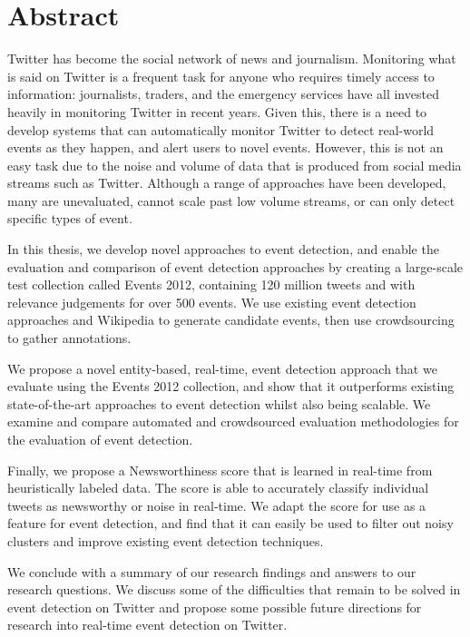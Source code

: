 
\chapter*{Abstract}
\thispagestyle{empty}
\vspace{-1cm}

Twitter has become the social network of news and journalism. Monitoring what is said on Twitter is a frequent task for anyone who requires timely access to information: journalists, traders, and the emergency services have all invested heavily in monitoring Twitter in recent years.
Given this, there is a need to develop systems that can automatically monitor Twitter to detect real-world events as they happen, and alert users to novel events. However, this is not an easy task due to the noise and volume of data that is produced from social media streams such as Twitter. Although a range of approaches have been developed, many are unevaluated, cannot scale past low volume streams, or can only detect specific types of event.

In this thesis, we develop novel approaches to event detection, and enable the evaluation and comparison of event detection approaches by creating a large-scale test collection called Events 2012, containing 120 million tweets and with relevance judgements for over 500 events. We use existing event detection approaches and Wikipedia to generate candidate events, then use crowdsourcing to gather annotations.

We propose a novel entity-based, real-time, event detection approach that we evaluate using the Events 2012 collection, and show that it outperforms existing state-of-the-art approaches to event detection whilst also being scalable.
We examine and compare automated and crowdsourced evaluation methodologies for the evaluation of event detection.

Finally, we propose a Newsworthiness score that is learned in real-time from heuristically labeled data. The score is able to accurately classify individual tweets as newsworthy or noise in real-time. We adapt the score for use as a feature for event detection, and find that it can easily be used to filter out noisy clusters and improve existing event detection techniques.

We conclude with a summary of our research findings and answers to our research questions. We discuss some of the difficulties that remain to be solved in event detection on Twitter and propose some possible future directions for research into real-time event detection on Twitter.